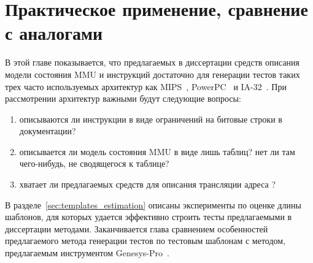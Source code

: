 \chapter{Практическое применение, сравнение с аналогами}

В этой главе показывается, что предлагаемых в диссертации средств
описания модели состояния MMU и инструкций достаточно для генерации
тестов таких трех часто используемых архитектур как MIPS~\cite{mips64II},
PowerPC~\cite{PowerPC} и IA-32~\cite{IA32}. При
рассмотрении архитектур важными будут следующие вопросы:
\begin{enumerate}
    \item описываются ли инструкции в виде ограничений на битовые
    строки в документации?
    \item описывается ли модель состояния MMU в виде лишь таблиц? нет ли там
чего-нибудь, не сводящегося к таблице?
    \item хватает ли предлагаемых средств для описания трансляции адреса ?
\end{enumerate}

В разделе~\ref{sec:templates_estimation} описаны эксперименты по оценке длины шаблонов, для
которых удается эффективно строить тесты предлагаемыми в диссертации
методами. Заканчивается глава
сравнением особенностей предлагаемого метода генерации тестов по
тестовым шаблонам с методом, предлагаемым инструментом
Genesys-Pro~\cite{GenesysPro}.





